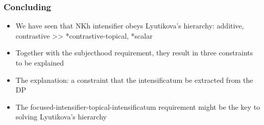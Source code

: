 \documentclass{beamer}
\begin{document}
\begin{frame}
    \frametitle{Concluding}

    \begin{itemize}
        \item We have seen that NKh intensifier obeys Lyutikova's hierarchy: additive, contrastive >> 
        *contrastive-topical, *scalar
        \item Together with the subjecthood requirement, they result in three constraints to be explained
        \pause
        \item The explanation: a constraint that the intensificatum be extracted from the DP
        \pause
        \item The focused-intensifier-topical-intensificatum requirement might be the key to solving Lyutikova's hierarchy
        
        
    \end{itemize}

\end{frame}
\end{document}
